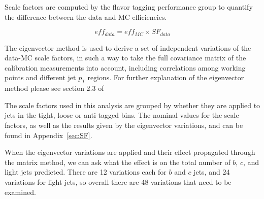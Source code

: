 Scale factors are computed by the flavor tagging performance group to quantify the
difference between the data and MC efficiencies.

    \begin{equation}
        eff_{data}=eff_{MC}\times SF_{data}
    \end{equation}


The eigenvector method is used to derive a set of independent variations of the data-MC scale
factors, in such a way to take the full covariance matrix of the calibration measurements
into account, including correlations among working points and different jet $p_{T}$ regions.
For further explanation of the eigenvector method please see section 2.3 of%

The scale factors used in this analysis are grouped by whether they are applied to jets in the
tight, loose or anti-tagged bins.  The nominal values for the scale factors, as well as the results
given by the eigenvector variations, and can be found in Appendix~\ref{sec:SF}.

When the eigenvector variations are applied and their effect propagated through the matrix method,
we can ask what the effect is on the total number of $b$, $c$, and light jets predicted.
There are 12 variations each for $b$ and $c$ jets, and 24 variations for light jets, so
overall there are 48 variations that need to be examined.






